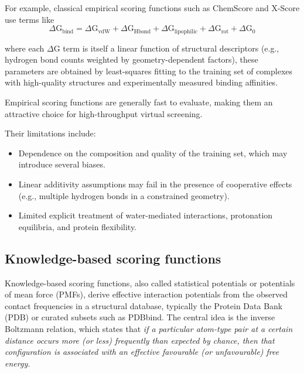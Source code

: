 \documentclass[12pt]{article}
\begin{document}
For example, classical empirical scoring functions such as ChemScore and X-Score use terms like
\begin{equation}
    \Delta \textrm{G}_{\textrm{bind}} = \Delta \textrm{G}_{\textrm{vdW}} + \Delta \textrm{G}_{\textrm{Hbond}} + \Delta \textrm{G}_{\textrm{lipophilic}} + \Delta \textrm{G}_{\textrm{rot}} + \Delta \textrm{G}_\textrm{0}
\label{eq:classicalEMP}
\end{equation}

where each $\Delta \textrm{G}$ term is itself a linear function of structural descriptors (e.g., hydrogen bond counts weighted by geometry-dependent factors), these parameters are obtained by least-squares fitting to the training set of complexes with high-quality structures and experimentally measured binding affinities\cite{CH3_Wang2017}.

Empirical scoring functions are generally fast to evaluate, making them an attractive choice for high-throughput virtual screening. 

Their limitations include:
\begin{itemize}
    \item Dependence on the composition and quality of the training set, which may introduce several biases.
    \item Linear additivity assumptions may fail in the presence of cooperative effects (e.g., multiple hydrogen bonds in a constrained geometry).
    \item Limited explicit treatment of water-mediated interactions, protonation equilibria, and protein flexibility.
\end{itemize}

\subsection{Knowledge-based scoring functions}

Knowledge-based scoring functions, also called statistical potentials or potentials of mean force (PMFs), derive effective interaction potentials from the observed contact frequencies in a structural database, typically the Protein Data Bank (PDB) or curated subsets such as PDBbind\cite{CH3_Wang2017}.  The central idea is the inverse Boltzmann relation, which states that \emph{if a particular atom-type pair at a certain distance occurs more (or less) frequently than expected by chance, then that configuration is associated with an effective favourable (or unfavourable) free energy.}
\end{document}
